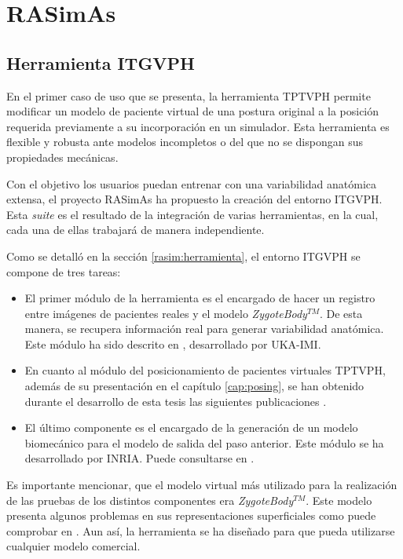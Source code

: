 \section{RASimAs}


\subsection{Herramienta \acs{ITGVPH}}
\label{result:herramienta}

En el primer caso de uso que se presenta, la herramienta \ac{TPTVPH} permite modificar un modelo de paciente virtual de una postura original a la posición requerida previamente a su incorporación en un simulador. Esta herramienta es flexible y robusta ante modelos incompletos o del que no se dispongan sus propiedades mecánicas. 

Con el objetivo los usuarios puedan entrenar con una variabilidad anatómica extensa, el proyecto \ac{RASimAs} ha propuesto la creación del entorno \ac{ITGVPH}. Esta \emph{suite} es el resultado de la integración de varias herramientas, en la cual, cada una de ellas trabajará de manera independiente. %


Como se detalló en la sección \ref{rasim:herramienta}, el entorno \ac{ITGVPH} se compone de tres tareas:

\begin{itemize}
    \item El primer módulo de la herramienta es el encargado de hacer un registro entre imágenes de pacientes reales y el modelo \emph{ZygoteBody}$^{TM}$. De esta manera, se recupera información real para generar variabilidad anatómica. Este módulo ha sido descrito en \cite{deOliveira:2015}, desarrollado por \ac{UKA-IMI}. 
    \item En cuanto al módulo del posicionamiento de pacientes virtuales \ac{TPTVPH}, además de su presentación en el capítulo \ref{cap:posing}, se han obtenido durante el desarrollo de esta tesis las siguientes publicaciones \cite{ceig.20151197, SUJAR2018268}.
    \item
    El último componente es el encargado de la generación de un modelo biomecánico para el modelo de salida del paso anterior. Este módulo se ha desarrollado por \ac{INRIA}. Puede consultarse en \cite{ded3.3}.
\end{itemize}

Es importante mencionar, que el modelo virtual más utilizado para la realización de las pruebas de los distintos componentes era \emph{ZygoteBody}$^{TM}$. Este modelo presenta algunos problemas en sus representaciones superficiales como puede comprobar en \cite{zaitseva}. Aun así, la herramienta se ha diseñado para que pueda utilizarse cualquier modelo comercial.%

